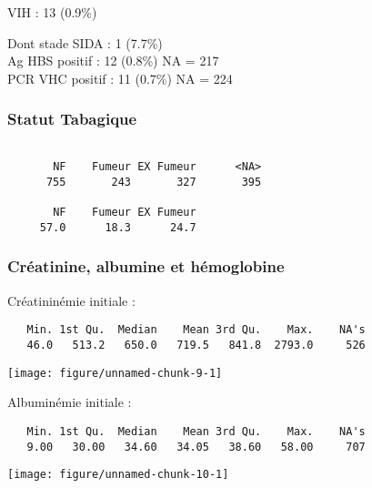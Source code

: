 \documentclass[11pt,a4paper]{article}\usepackage[]{graphicx}\usepackage[]{color}
\makeatletter
\def\maxwidth{ %
  \ifdim\Gin@nat@width>\linewidth
    \linewidth
  \else
    \Gin@nat@width
  \fi
}
\newenvironment{kframe}{%
 \def\at@end@of@kframe{}%
 \ifinner\ifhmode%
  \def\at@end@of@kframe{\end{minipage}}%
  \begin{minipage}{\columnwidth}%
 \fi\fi%
 \def\FrameCommand##1{\hskip\@totalleftmargin \hskip-\fboxsep
 \colorbox{shadecolor}{##1}\hskip-\fboxsep
     \hskip-\linewidth \hskip-\@totalleftmargin \hskip\columnwidth}%
 \MakeFramed {\advance\hsize-\width
   \@totalleftmargin\z@ \linewidth\hsize
   \@setminipage}}%
 {\par\unskip\endMakeFramed%
 \at@end@of@kframe}
\newenvironment{knitrout}{}{} %
\makeatother
\begin{document}
VIH : 13 (0.9\%)

Dont stade SIDA : 1 (7.7\%)
~\\

Ag HBS positif : 12 (0.8\%) NA = 217
~\\

PCR VHC positif : 11 (0.7\%) NA = 224


    \subsubsection{Statut Tabagique}

\begin{knitrout}
\color{fgcolor}\begin{kframe}
\begin{verbatim}

       NF    Fumeur EX Fumeur      <NA> 
      755       243       327       395 

       NF    Fumeur EX Fumeur 
     57.0      18.3      24.7 
\end{verbatim}
\end{kframe}
\end{knitrout}

    \subsubsection{Créatinine, albumine et hémoglobine}

Créatininémie initiale :

\begin{knitrout}
\color{fgcolor}\begin{kframe}
\begin{verbatim}
   Min. 1st Qu.  Median    Mean 3rd Qu.    Max.    NA's 
   46.0   513.2   650.0   719.5   841.8  2793.0     526 
\end{verbatim}
\end{kframe}
\texttt{[image: figure/unnamed-chunk-9-1]} 

\end{knitrout}

Albuminémie initiale :

\begin{knitrout}
\color{fgcolor}\begin{kframe}
\begin{verbatim}
   Min. 1st Qu.  Median    Mean 3rd Qu.    Max.    NA's 
   9.00   30.00   34.60   34.05   38.60   58.00     707 
\end{verbatim}
\end{kframe}
\texttt{[image: figure/unnamed-chunk-10-1]} 

\end{knitrout}
\end{document}
